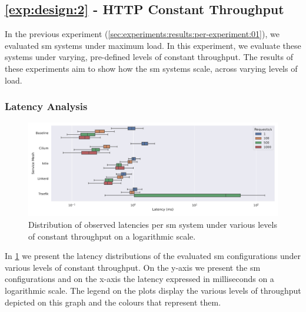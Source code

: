 \subsection{\ref{exp:design:2} - HTTP Constant Throughput}
\label{sec:experiments:results:per-experiment:02}

In the previous experiment (\cref{sec:experiments:results:per-experiment:01}), we evaluated \gls{sm} systems under maximum load. In this experiment, we evaluate these systems under varying, pre-defined levels of constant throughput. The results of these experiments aim to show how the \gls{sm} systems scale, across varying levels of load.

\subsubsection{Latency Analysis}
\label{sec:experiments:results:per-experiment:02:latency}

\begin{figure}[ht]
    \centering
    
    \includegraphics[width=1\linewidth]{5_experimental_evaluation/figures/exp-02-latency-log.pdf}
    
    \caption[Distribution of observed latencies per \gls{sm} system under various levels of constant throughput]{Distribution of observed latencies per \gls{sm} system under various levels of constant throughput on a logarithmic scale.}
    
    \label{fig:exp:02:latency-distributions}
\end{figure}


In \cref{fig:exp:02:latency-distributions} we present the latency distributions of the evaluated \gls{sm} configurations under various levels of constant throughput.  On the y-axis we present the \gls{sm} configurations and on the x-axis the latency expressed in milliseconds on a logarithmic scale. The legend on the plots display the various levels of throughput depicted on this graph and the colours that represent them.

